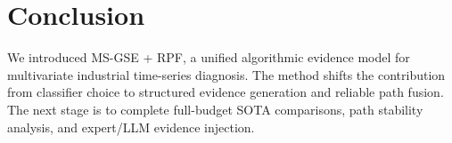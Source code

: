\documentclass[letterpaper]{article}
\begin{document}
\section{Conclusion}

We introduced MS-GSE + RPF, a unified algorithmic evidence model for multivariate industrial time-series diagnosis. The method shifts the contribution from classifier choice to structured evidence generation and reliable path fusion. The next stage is to complete full-budget SOTA comparisons, path stability analysis, and expert/LLM evidence injection.


\end{document}
